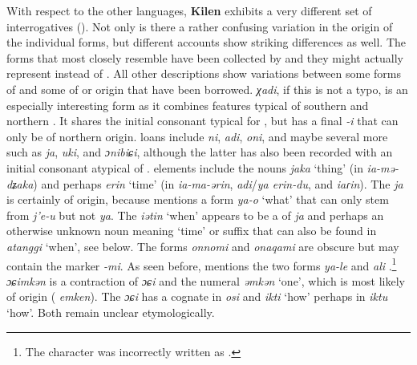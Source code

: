 \newpage 
With respect to the other  languages, \textbf{Kilen} exhibits a very different set of interrogatives (). Not only is there a rather confusing variation in the origin of the individual forms, but different accounts show striking differences as well. The forms that most closely resemble  have been collected by \citet{Ling1934} and they might actually represent  instead of . All other descriptions show variations between some forms of  and some of  or  origin that have been borrowed. \textit{χadi}, if this is not a typo, is an especially interesting form as it combines features typical of southern and northern . It shares the initial consonant typical for , but has a final \textit{-i} that can only be of northern  origin.  loans include \textit{ni}, \textit{adi}, \textit{oni}, and maybe several more such as \textit{ja}, \textit{uki}, and \textit{ɔnibiɕi}, although the latter has also been recorded with an initial consonant atypical of .  elements include the nouns \textit{jaka} ‘thing’ (in \textit{ia}\textit{-}\textit{mə-dʑaka}) and perhaps \textit{erin} ‘time’ (in \textit{ia-}\textit{ma-ərin}, \textit{adi}/\textit{ya erin-du}, and \textit{iaɾin}). The  \textit{ja} is certainly of  origin, because \citet[199]{LiLinjing2011} mentions a form \textit{ya-o} ‘what’ that can only stem from  \textit{j’e-u} but not  \textit{ya}. The  \textit{iətin} ‘when’ appears to be a  of \textit{ja} and perhaps an otherwise unknown noun meaning ‘time’ or suffix that can also be found in  \textit{atanggi} ‘when’, see below. The forms \textit{onnomi} and \textit{onaqami} are obscure but may contain the  marker \textit{-mi}. As seen before, \cite[82]{NDSSLD1958} mentions the two  forms \textit{ya-le}  and \textit{ali} .\footnote{The character  was incorrectly written as .}  \textit{ɔɕimkən} is a contraction of \textit{ɔɕi} and the numeral \textit{əmkən} ‘one’, which is most likely of  origin ( \textit{emken}). The  \textit{ɔɕi} has a cognate in  \textit{osi} and \textit{ikti} ‘how’ perhaps in  \textit{iktu} ‘how’. Both remain unclear etymologically.


